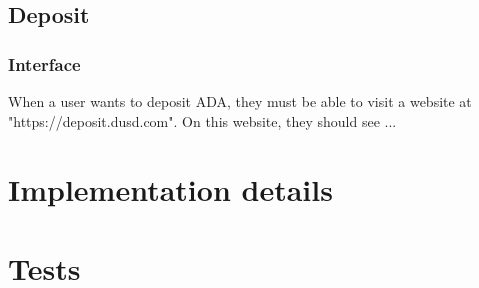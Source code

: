 \documentclass{article} %
\begin{document}
\subsection{Deposit}

\subsubsection{Interface}

When a user wants to deposit ADA, they must be able to visit a website at "https://deposit.dusd.com".
On this website, they should see ...

\section{Implementation details}

\section{Tests}
\end{document}

